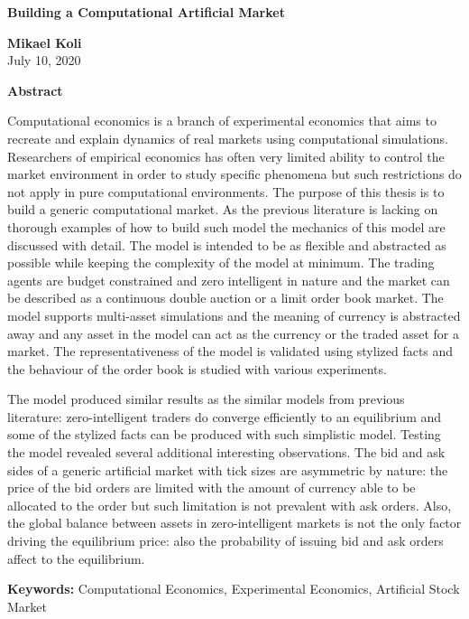 \thispagestyle{plain}
\begin{center}
    \Large
    \textbf{Building a Computational Artificial Market}
        
    \vspace{0.4cm}
    \large
        
    \vspace{0.4cm}
    \textbf{Mikael Koli} \\
    July 10, 2020 %
       
    \vspace{0.9cm}
    \textbf{Abstract}
\end{center}

Computational economics is a branch of experimental economics that aims to 
recreate and explain dynamics of real markets using computational simulations. Researchers of
empirical economics has often very limited ability to control the market environment 
in order to study specific phenomena but such restrictions do not apply in pure computational
environments. The purpose of this thesis is to build a generic computational market. As the
previous literature is lacking on thorough examples of how to build such model the mechanics of this
model are discussed with detail. The model is intended to be as flexible and abstracted as possible 
while keeping the complexity of the model at minimum. The trading agents are budget constrained 
and zero intelligent in nature and the market can be described as a continuous double auction or a 
limit order book market. The model supports multi-asset simulations and the meaning of currency is 
abstracted away and any asset in the model can act as the currency or the traded asset for a market. 
The representativeness of the model is validated using stylized facts and the behaviour
of the order book is studied with various experiments.

The model produced similar results as the similar models from previous literature: zero-intelligent
traders do converge efficiently to an equilibrium and some of the stylized facts can be produced
with such simplistic model. Testing the model revealed several additional interesting observations.
The bid and ask sides of a generic artificial market with tick sizes are asymmetric by nature: the 
price of the bid orders are limited with the amount of currency able to be allocated to the order 
but such limitation is not prevalent with ask orders. Also, the global balance between assets in 
zero-intelligent markets is not the only factor driving the equilibrium price: also the probability 
of issuing bid and ask orders affect to the equilibrium.

\textbf{Keywords:} Computational Economics, Experimental Economics, Artificial Stock Market